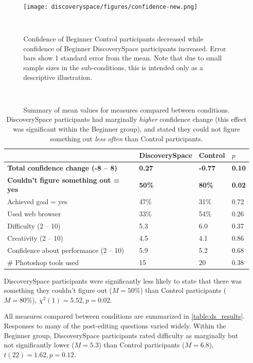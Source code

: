 \begin{figure}[t!]
\centering
  \texttt{[image: discoveryspace/figures/confidence-new.png]}
  \caption{Confidence of Beginner Control participants decreased while confidence of Beginner Discovery\-Space participants increased. Error bars show 1 standard error from the mean. Note that due to small sample sizes in the sub-conditions, this is intended only as a descriptive illustration.}~\label{fig:discoveryspace_confidence}
\end{figure}

\begin{table}[t]
\centering
\caption{Summary of mean values for measures compared between conditions. Discovery\-Space participants had marginally \textit{higher} confidence change (this effect was significant within the Beginner group), and stated they could not figure something out \textit{less often} than Control participants.}~\label{table:ds_results}
\begin{tabular}{l|l|l|l}
 & DiscoverySpace & Control & $p$ \\ \hline
\textbf{Total confidence change (-8 – 8)} & \textbf{0.27} & \textbf{-0.77} & \textbf{0.10} \\
\textbf{Couldn’t figure something out = yes} & \textbf{50\%} & \textbf{80\%} & \textbf{0.02} \\
Achieved goal = yes & 47\% & 31\% & 0.72 \\
Used web browser & 33\% & 54\% & 0.26 \\
Difficulty (2 – 10) & 5.3 & 6.0 & 0.37 \\
Creativity (2 – 10) & 4.5 & 4.1 & 0.86 \\
Confidence about performance (2 – 10) & 5.9 & 5.2 & 0.68 \\
\# Photoshop tools used & 15 & 20 & 0.38
\end{tabular}
\end{table}

Discovery\-Space participants were significantly less likely to state that there was something they couldn't figure out ($M = 50\%$) than Control participants ($M = 80\%$), $\chi^2(1) = 5.52, p = 0.02$. 

All measures compared between conditions are summarized in \autoref{table:ds_results}. Responses to many of the post-editing questions varied widely. Within the Beginner group, Discovery\-Space participants rated difficulty as marginally but not significantly lower ($M = 5.3$) than Control participants ($M = 6.8$), $t(22) = 1.62, p = 0.12$. 

